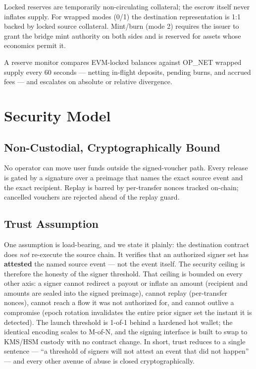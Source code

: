 \documentclass[11pt,a4paper]{article}
\begin{document}
Locked reserves are temporarily non-circulating collateral; the escrow itself never inflates supply. For wrapped modes (0/1) the destination representation is 1:1 backed by locked source collateral. Mint/burn (mode 2) requires the issuer to grant the bridge mint authority on both sides and is reserved for assets whose economics permit it.

A reserve monitor compares EVM-locked balances against OP\_NET wrapped supply every 60 seconds --- netting in-flight deposits, pending burns, and accrued fees --- and escalates on absolute or relative divergence.

\section{Security Model}

\subsection{Non-Custodial, Cryptographically Bound}

No operator can move user funds outside the signed-voucher path. Every release is gated by a signature over a preimage that names the exact source event and the exact recipient. Replay is barred by per-transfer nonces tracked on-chain; cancelled vouchers are rejected ahead of the replay guard.

\subsection{Trust Assumption}

One assumption is load-bearing, and we state it plainly: the destination contract does \emph{not} re-execute the source chain. It verifies that an authorized signer set has \textbf{attested} the named source event --- not the event itself. The security ceiling is therefore the honesty of the signer threshold. That ceiling is bounded on every other axis: a signer cannot redirect a payout or inflate an amount (recipient and amounts are sealed into the signed preimage), cannot replay (per-transfer nonces), cannot reach a flow it was not authorized for, and cannot outlive a compromise (epoch rotation invalidates the entire prior signer set the instant it is detected). The launch threshold is 1-of-1 behind a hardened hot wallet; the identical encoding scales to M-of-N, and the signing interface is built to swap to KMS/HSM custody with no contract change. In short, trust reduces to a single sentence --- ``a threshold of signers will not attest an event that did not happen'' --- and every other avenue of abuse is closed cryptographically.
\end{document}
